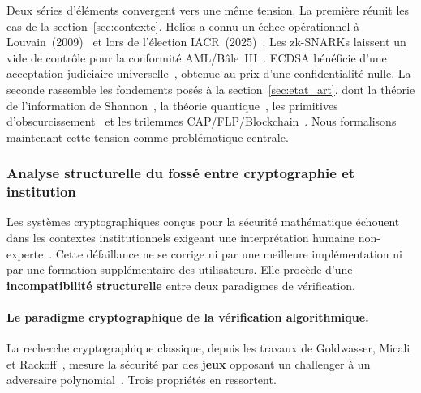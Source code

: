 \begin{sloppypar}
Deux s\'eries d'\'el\'ements convergent vers une m\^eme tension. La premi\`ere r\'eunit
les cas de la section~\ref{sec:contexte}. Helios a connu un \'echec op\'erationnel \`a
Louvain~(2009)~\cite{Adida09UCL,Goodman15} et lors de l'\'election IACR~(2025)~\cite{IACR2025incident}. Les zk-SNARKs laissent un vide de contr\^ole
pour la conformit\'e AML/B\^ale~III~\cite{BaselIII,Garratt19}. ECDSA b\'en\'eficie d'une
acceptation judiciaire universelle~\cite{ESIGN00,eIDAS14}, obtenue au prix d'une
confidentialit\'e nulle. La seconde rassemble les fondements pos\'es \`a la section~\ref{sec:etat_art}, dont la th\'eorie de l'information de
Shannon~\cite{Shannon48,Shannon49,CoverThomas06}, la th\'eorie quantique~\cite{Wilde2017,Holevo1973}, les primitives d'obscurcissement~\cite{Pedersen91,Groth16} et les trilemmes
CAP/FLP/Blockchain~\cite{GilbertLynch02,Buterin17,Nakamoto08}. Nous formalisons maintenant cette tension comme probl\'ematique centrale.

\subsubsection{Analyse structurelle du foss\'e entre cryptographie et institution}
\label{subsubsec:fosse_crypto_institution}

Les syst\`emes cryptographiques con\c{c}us pour la s\'ecurit\'e math\'ematique
\'echouent dans les contextes institutionnels exigeant une interpr\'etation
humaine non-experte~\cite{Bonneau12,Whitten99,Herley09}. Cette d\'efaillance ne se corrige ni par une
meilleure impl\'ementation ni par une formation suppl\'ementaire des
utilisateurs. Elle proc\`ede d'une \textbf{incompatibilit\'e structurelle}
entre deux paradigmes de v\'erification.

\paragraph{Le paradigme cryptographique de la v\'erification algorithmique.}
\label{par:paradigme_crypto}

La recherche cryptographique classique, depuis les travaux de
Goldwasser, Micali et Rackoff~\cite{GMR85}, mesure la s\'ecurit\'e par
des \textbf{jeux} opposant un challenger \`a un adversaire polynomial~\cite{Goldreich01,Shoup01}.
Trois propri\'et\'es en ressortent.


\end{sloppypar}
